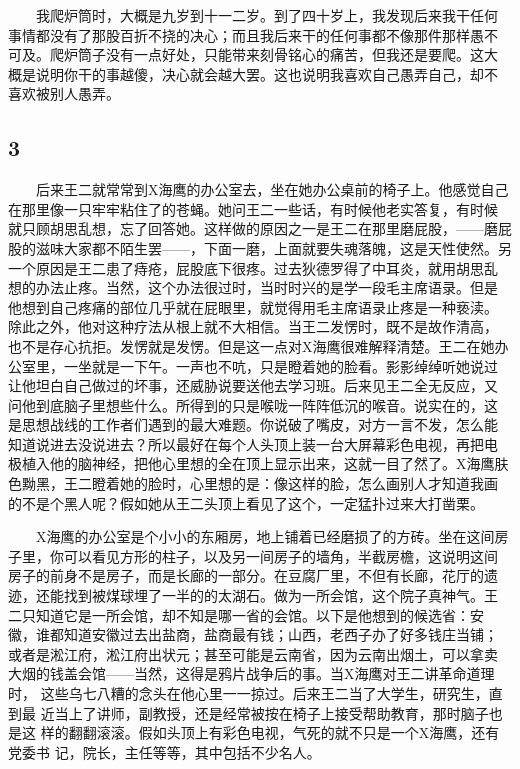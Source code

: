 　　我爬炉筒时，大概是九岁到十一二岁。到了四十岁上，我发现后来我干任何
事情都没有了那股百折不挠的决心；而且我后来干的任何事都不像那件那样愚不
可及。爬炉筒子没有一点好处，只能带来刻骨铭心的痛苦，但我还是要爬。这大
概是说明你干的事越傻，决心就会越大罢。这也说明我喜欢自己愚弄自己，却不
喜欢被别人愚弄。

\subsection{3}

　　后来王二就常常到X海鹰的办公室去，坐在她办公桌前的椅子上。他感觉自己
在那里像一只牢牢粘住了的苍蝇。她问王二一些话，有时候他老实答复，有时候
就只顾胡思乱想，忘了回答她。这样做的原因之一是王二在那里磨屁股，——磨屁
股的滋味大家都不陌生罢——，下面一磨，上面就要失魂落魄，这是天性使然。另
一个原因是王二患了痔疮，屁股底下很疼。过去狄德罗得了中耳炎，就用胡思乱
想的办法止疼。当然，这个办法很过时，当时时兴的是学一段毛主席语录。但是
他想到自己疼痛的部位几乎就在屁眼里，就觉得用毛主席语录止疼是一种亵渎。
除此之外，他对这种疗法从根上就不大相信。当王二发愣时，既不是故作清高，
也不是存心抗拒。发愣就是发愣。但是这一点对X海鹰很难解释清楚。王二在她办
公室里，一坐就是一下午。一声也不吭，只是瞪着她的脸看。影影绰绰听她说过
让他坦白自己做过的坏事，还威胁说要送他去学习班。后来见王二全无反应，又
问他到底脑子里想些什么。所得到的只是喉咙一阵阵低沉的喉音。说实在的，这
是思想战线的工作者们遇到的最大难题。你说破了嘴皮，对方一言不发，怎么能
知道说进去没说进去？所以最好在每个人头顶上装一台大屏幕彩色电视，再把电
极植入他的脑神经，把他心里想的全在顶上显示出来，这就一目了然了。X海鹰肤
色黝黑，王二瞪着她的脸时，心里想的是：像这样的脸，怎么画别人才知道我画
的不是个黑人呢？假如她从王二头顶上看见了这个，一定猛扑过来大打凿栗。

　　X海鹰的办公室是个小小的东厢房，地上铺着已经磨损了的方砖。坐在这间房
子里，你可以看见方形的柱子，以及另一间房子的墙角，半截房檐，这说明这间
房子的前身不是房子，而是长廊的一部分。在豆腐厂里，不但有长廊，花厅的遗
迹，还能找到被煤球埋了一半的的太湖石。做为一所会馆，这个院子真神气。王
二只知道它是一所会馆，却不知是哪一省的会馆。以下是他想到的候选省：安
徽，谁都知道安徽过去出盐商，盐商最有钱；山西，老西子办了好多钱庄当铺；
或者是淞江府，淞江府出状元；甚至可能是云南省，因为云南出烟土，可以拿卖
大烟的钱盖会馆——当然，这得是鸦片战争后的事。当X海鹰对王二讲革命道理时，
这些乌七八糟的念头在他心里一一掠过。后来王二当了大学生，研究生，直到最
近当上了讲师，副教授，还是经常被按在椅子上接受帮助教育，那时脑子也是这
样的翻翻滚滚。假如头顶上有彩色电视，气死的就不只是一个X海鹰，还有党委书
记，院长，主任等等，其中包括不少名人。

